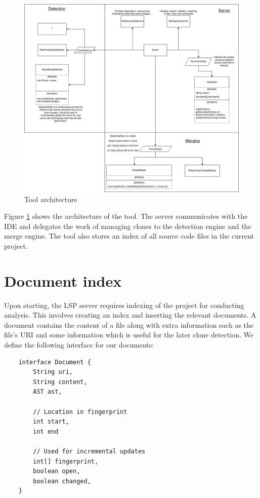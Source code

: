 \begin{figure}
	\includegraphics[width=\textwidth]{images/ToolArchitecture.png}
	\caption{Tool architecture}
	\label{fig:architecture}
\end{figure}

Figure \ref{fig:architecture} shows the architecture of the tool. The server communicates
with the IDE and delegates the work of managing clones to the detection engine and the
merge engine. The tool also stores an index of all source code files in the current project.

\section{Document index}

Upon starting, the LSP server requires indexing of the project for conducting analysis.
This involves creating an index and inserting the relevant documents. A document contains the
content of a file along with extra information such as the file's URI and some information
which is useful for the later clone detection. We define the following interface for our
documents:

\begin{lstlisting}
    interface Document {
        String uri,
        String content,
        AST ast,

        // Location in fingerprint
        int start,
        int end

        // Used for incremental updates
        int[] fingerprint,
        boolean open,
        boolean changed,
    }
\end{lstlisting}

